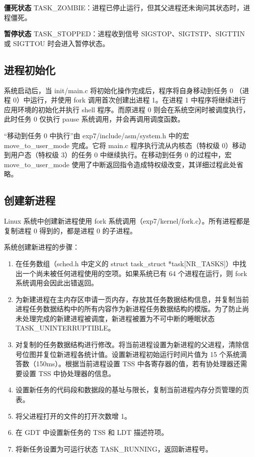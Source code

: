 \textbf{僵死状态} TASK\_ZOMBIE：进程已停止运行，但其父进程还未询问其状态时，进程僵死。

\textbf{暂停状态} TASK\_STOPPED：进程收到信号 SIGSTOP、SIGTSTP、SIGTTIN 或 SIGTTOU 时会进入暂停状态。

\subsection{进程初始化}

系统启动后，当 init/main.c 将初始化操作完成后，程序将自身移动到任务 0 （进程 0）中运行，并使用 fork 调用首次创建出进程 1。在进程 1 中程序将继续进行应用环境的初始化并执行 shell 程序。而原进程 0 则会在系统空闲时被调度执行，此时任务 0 仅执行 pause 系统调用，并会再调用调度函数。

“移动到任务 0 中执行”由 exp7/include/asm/system.h 中的宏 move\_to\_user\_mode 完成。它将 main.c 程序执行流从内核态（特权级 0）移动到用户态（特权级 3）的任务 0 中继续执行。在移动到任务 0 的过程中，宏 move\_to\_user\_mode 使用了中断返回指令造成特权级改变，其详细过程此处省略。

\subsection{创建新进程}

Linux 系统中创建新进程使用 fork 系统调用（exp7/kernel/fork.c）。所有进程都是复制进程 0 得到的，都是进程 0 的子进程。

系统创建新进程的步骤：

\begin{enumerate}
    \item 在任务数组（sched.h 中定义的 struct task\_struct *task[NR\_TASKS]）中找出一个尚未被任何进程使用的空项。如果系统已有 64 个进程在运行，则 fork 系统调用会因此出错返回。
    \item 为新建进程在主内存区申请一页内存，存放其任务数据结构信息，并复制当前进程任务数据结构中的所有内容作为新进程任务数据结构的模版。为了防止尚未处理完成的新建进程被调度，新进程被置为不可中断的睡眠状态 TASK\_UNINTERRUPTIBLE。
    \item 对复制的任务数据结构进行修改。将当前进程设置为新进程的父进程，清除信号位图并复位新进程各统计值。设置新进程初始运行时间片值为 15 个系统滴答数（150ms）。根据当前进程设置 TSS 中各寄存器的值，若有协处理器还需要设置 TSS 中协处理器的信息。
    \item 设置新任务的代码段和数据段的基址与限长，复制当前进程内存分页管理的页表。
    \item 将父进程打开的文件的打开次数增 1。
    \item 在 GDT 中设置新任务的 TSS 和 LDT 描述符项。
    \item 将新任务设置为可运行状态 TASK\_RUNNING，返回新进程号。
\end{enumerate}

